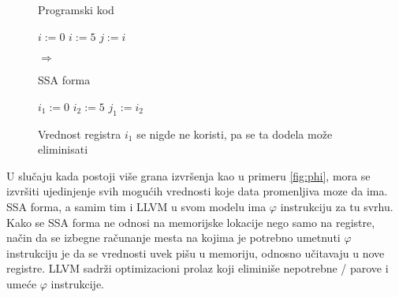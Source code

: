 \begin{figure}[h]
\begin{minipage}[t][8em]{0.45\textwidth}
  \begin{algorithm}[H]
  \caption{Programski kod}
  \begin{algorithmic}
		\State $i := 0$
		\State $i := 5$
		\State $j := i$
  \end{algorithmic}
  \end{algorithm}
\end{minipage}
\begin{minipage}[t][8em][c]{0.05\textwidth}
  $\Rightarrow$
\end{minipage}
\begin{minipage}[t][8em]{0.45\textwidth}
  \begin{algorithm}[H]
  \caption{SSA forma}
  \begin{algorithmic}
		\State $i_1 := 0$
		\State $i_2 := 5$
		\State $j_1 := i_2$
  \end{algorithmic}
  \end{algorithm}
\end{minipage}
\caption{Vrednost registra $i_1$ se nigde ne koristi, pa se ta dodela može eliminisati}
\end{figure}

U slučaju kada postoji više grana izvršenja kao u primeru \ref{fig:phi}, mora se izvršiti ujedinjenje svih mogućih vrednosti koje data promenljiva moze da ima.
SSA forma, a samim tim i LLVM u svom modelu ima $\varphi$ instrukciju za tu svrhu.
Kako se SSA forma ne odnosi na memorijske lokacije nego samo na registre, način da se izbegne računanje mesta na kojima je potrebno umetnuti $\varphi$ instrukciju je da se vrednosti uvek pišu u memoriju, odnosno učitavaju u nove registre.
LLVM sadrži optimizacioni prolaz koji eliminiše nepotrebne / parove i umeće $\varphi$ instrukcije.

